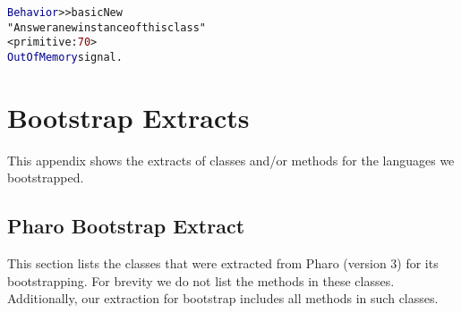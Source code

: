 \begin{alltt}
\textcolor{darkBlue}{Behavior} >> basicNew
    \textcolor{comment}{"Answer a new instance of this class"}
    <primitive: \textcolor{darkRed}{70}>
    \textcolor{darkBlue}{OutOfMemory} signal.
\end{alltt}

\chapter{Bootstrap Extracts}
\label{appendixbootstrap}

This appendix shows the extracts of classes and/or methods for the languages we bootstrapped.

\section{Pharo Bootstrap Extract}

This section lists the classes that were extracted from Pharo (version 3) for its bootstrapping. For brevity we do not list the methods in these classes. Additionally, our extraction for bootstrap includes all methods in such classes.

